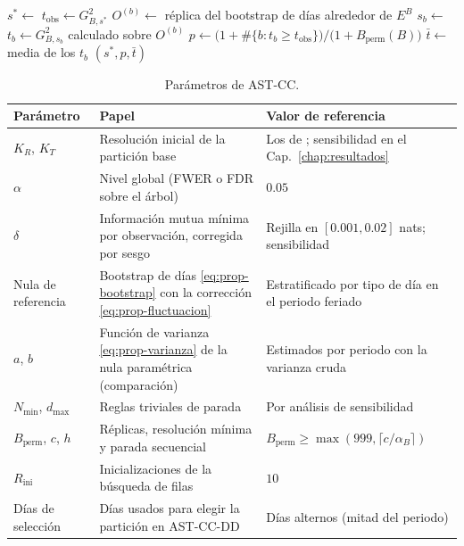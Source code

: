 \begin{algorithm}[t]
\caption{Selección del mejor corte con ajuste min-P}\label{alg:mejorcorte}
\begin{algorithmic}[1]
  \State $s^\ast\gets$  
  \State $t_{\mathrm{obs}}\gets G^2_{B,s^\ast}$
    \State $O^{(b)}\gets$ réplica del bootstrap de días alrededor de $E^B$ 
    \State $s_b\gets$  
    \State $t_b\gets G^2_{B,s_b}$ calculado sobre $O^{(b)}$
  \EndFor
  \State $p\gets \bigl(1+\#\{b: t_b\ge t_{\mathrm{obs}}\}\bigr)/\bigl(1+B_{\mathrm{perm}}(B)\bigr)$
  \State $\bar t\gets$ media de los $t_b$ 
  \State \Return $(s^\ast, p, \bar t)$
\EndFunction
\end{algorithmic}
\end{algorithm}

\begin{table}[t]
\centering
\small
\begin{tabular}{>{\raggedright\arraybackslash}p{}>{\raggedright\arraybackslash}p{}>{\raggedright\arraybackslash}p{}}
\toprule
Parámetro & Papel & Valor de referencia \\
\midrule
$K_R$, $K_T$ & Resolución inicial de la partición base & Los de \cite{Liu2021}; sensibilidad en el Cap.~\ref{chap:resultados} \\
$\alpha$ & Nivel global (FWER o FDR sobre el árbol) & $0.05$ \\
$\delta$ & Información mutua mínima por observación, corregida por sesgo & Rejilla en $[0.001, 0.02]$ nats; sensibilidad \\
Nula de referencia & Bootstrap de días \eqref{eq:prop-bootstrap} con la corrección \eqref{eq:prop-fluctuacion} & Estratificado por tipo de día en el periodo feriado \\
$a$, $b$ & Función de varianza \eqref{eq:prop-varianza} de la nula paramétrica (comparación) & Estimados por periodo con la varianza cruda \\
$N_{\min}$, $d_{\max}$ & Reglas triviales de parada & Por análisis de sensibilidad \\
$B_{\mathrm{perm}}$, $c$, $h$ & Réplicas, resolución mínima y parada secuencial & $B_{\mathrm{perm}}\ge\max(999,\lceil c/\alpha_B\rceil)$ \\
$R_{\mathrm{ini}}$ & Inicializaciones de la búsqueda de filas & $10$ \\
Días de selección & Días usados para elegir la partición en AST-CC-DD & Días alternos (mitad del periodo) \\
\bottomrule
\end{tabular}
\caption{Parámetros de AST-CC.}
\label{tab:prop-parametros}
\end{table}

